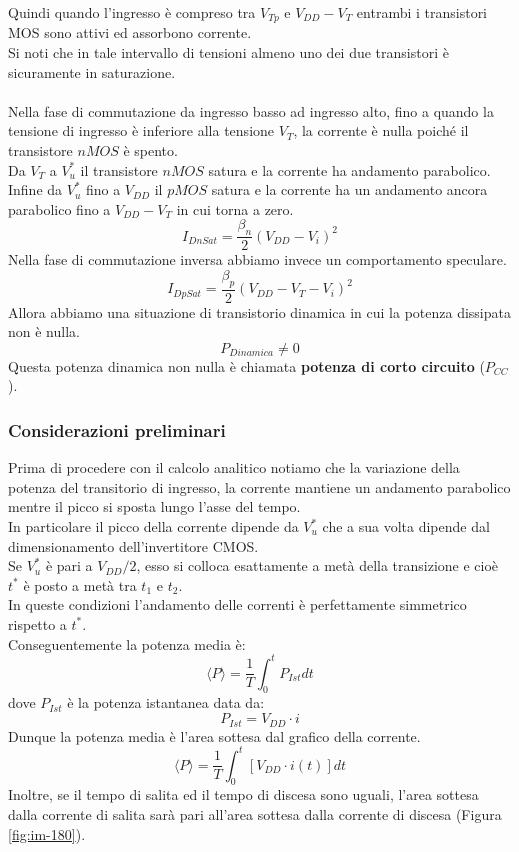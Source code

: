 \documentclass[../main.tex]{subfiles}
\begin{document}
	Quindi quando l'ingresso è compreso tra $V_{Tp}$ e $V_{DD} - V_T$ entrambi i transistori MOS sono attivi ed assorbono corrente.\\
	Si noti che in tale intervallo di tensioni almeno uno dei due transistori è sicuramente in saturazione.\\\\
	Nella fase di commutazione da ingresso basso ad ingresso alto, fino a quando la tensione di ingresso è inferiore alla tensione $V_T$, la corrente è nulla poiché il
	transistore $nMOS$ è spento.\\
	Da $V_T$ a $V_u^*$ il transistore $nMOS$ satura e la corrente ha andamento parabolico.\\
	Infine da $V_u^*$ fino a $V_{DD}$ il $pMOS$ satura e la corrente ha un andamento ancora parabolico fino a $V_{DD} - V_T$ in cui torna a zero.
	$$I_{DnSat} = \frac{\beta_n}{2} (V_{DD} - V_i)^2$$
	Nella fase di commutazione inversa abbiamo invece un comportamento speculare.
	$$I_{DpSat} = \frac{\beta_p}{2} (V_{DD} - V_T - V_i)^2$$
	Allora abbiamo una situazione di transistorio dinamica in cui la potenza dissipata non è nulla.
	$$P_{Dinamica} \neq 0$$
	Questa potenza dinamica non nulla è chiamata \textbf{potenza di corto circuito} ($P_{CC}$).
	\subsubsection{Considerazioni preliminari}
	Prima di procedere con il calcolo analitico notiamo che la variazione della potenza del transitorio di ingresso, la corrente mantiene un andamento parabolico mentre il picco si sposta lungo l'asse del tempo.\\
	In particolare il picco della corrente dipende da $V_u^*$ che a sua volta dipende dal dimensionamento dell'invertitore CMOS.\\
	Se $V_u^*$ è pari a $V_{DD}/2$, esso si colloca esattamente a metà della transizione e cioè $t^*$ è posto a metà tra $t_1$ e $t_2$.\\
	In queste condizioni l'andamento delle correnti è perfettamente simmetrico rispetto a $t^*$.\\
	Conseguentemente la potenza media è:
	$$\langle P \rangle = \frac{1}{T} \int_0^t P_{Ist} dt$$
	dove $P_{Ist}$ è la potenza istantanea data da:
	$$P_{Ist} = V_{DD} \cdot i$$
	Dunque la potenza media è l'area sottesa dal grafico della corrente.
	$$\langle P \rangle = \frac{1}{T} \int_0^t [V_{DD} \cdot i(t)] dt$$
	Inoltre, se il tempo di salita ed il tempo di discesa sono uguali, l'area sottesa dalla corrente di salita sarà pari all'area sottesa dalla corrente di discesa (Figura \ref{fig:im-180}).
\end{document}
